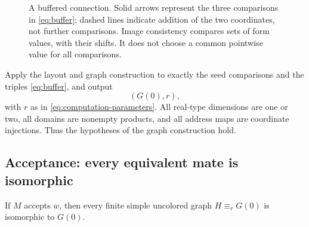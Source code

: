 \begin{figure}[htbp]
\centering
{}
\caption{A buffered connection.  Solid arrows represent the three comparisons
in \eqref{eq:buffer}; dashed lines indicate addition of the two coordinates,
not further comparisons.  Image consistency compares sets of form values,
with their shifts.  It does not choose a common pointwise value for all
comparisons.}
\label{fig:buffer}
\end{figure}

Apply the layout and graph construction to exactly the seed comparisons and
the triples \eqref{eq:buffer}, and output
\begin{equation}
 (G(0),r),
 \label{eq:reduction-output}
\end{equation}
with \(r\) as in \eqref{eq:computation-parameters}.  All real-type dimensions
are one or two, all domains are nonempty products, and all address maps are
coordinate injections.  Thus the hypotheses of the graph construction hold.

\subsection{Acceptance: every equivalent mate is isomorphic}

\begin{proposition}
\label{prop:acceptance}
If \(M\) accepts \(w\), then every finite simple uncolored graph
\(H\equiv_r G(0)\) is isomorphic to \(G(0)\).
\end{proposition}


